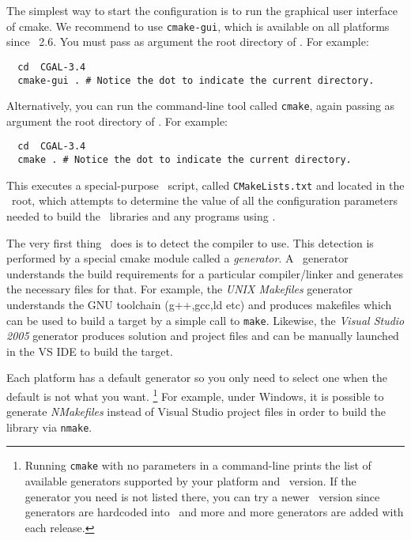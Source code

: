 The simplest way to start the configuration is to run the graphical
user interface of cmake. We recommend to use \texttt{cmake-gui}, which
is available on all platforms since \cmake\ 2.6.   You must pass as 
argument the root directory of \cgal. For example:

{\ccTexHtml{\scriptsize}{}
\begin{verbatim}
  cd  CGAL-3.4
  cmake-gui . # Notice the dot to indicate the current directory.
\end{verbatim}
}

Alternatively, you can run the command-line tool called
\texttt{cmake}, again passing as argument the root directory of
\cgal. For example:

{\ccTexHtml{\scriptsize}{}
\begin{verbatim}
  cd  CGAL-3.4
  cmake . # Notice the dot to indicate the current directory.
\end{verbatim}
}

This executes a special-purpose \cmake\ script, called
\texttt{CMakeLists.txt} and located in the \cgal\ root, which attempts to
determine the value of all the configuration parameters needed to build the
\cgal\ libraries and any programs using \cgal.

The very first thing \cmake\ does is to detect the compiler to use.
This detection is performed by a special cmake module called a {\em generator}. A
\cmake\ generator understands the build requirements for a particular compiler/linker
 and generates the necessary files for that. For example, the 
{\em UNIX Makefiles} generator understands the GNU toolchain (g++,gcc,ld etc) and produces makefiles
which can be used to build a target by a simple call to \texttt{make}.
Likewise, the {\em Visual Studio 2005} generator produces solution and project files and can be manually
launched in the VS IDE to build the target.

Each platform has a default generator so you only need to select one when the default is
not what you want. 
\footnote{Running \texttt{cmake} with no parameters in a command-line prints the list of available generators supported 
by your platform and \cmake\ version. If the generator you need is not listed there, you can
try a newer \cmake\ version since generators are hardcoded into \cmake\ and more and
more generators are added with each release.}
For example, under Windows, it is possible to generate {\em NMakefiles}
instead of Visual Studio project files in order to build the library via \texttt{nmake}.

